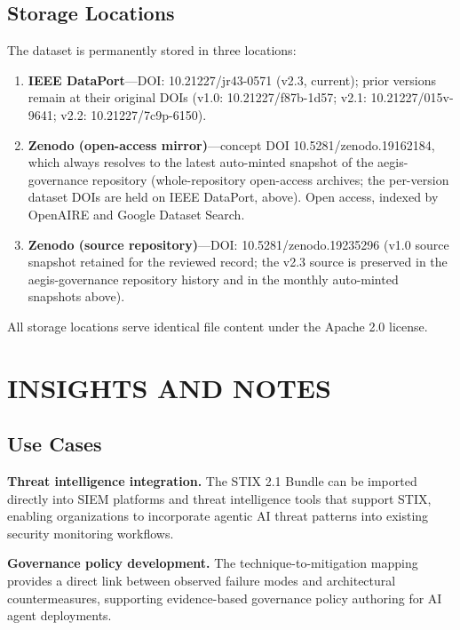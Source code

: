 \documentclass{IEEEoj-data}
\newcommand{\replaced}[2]{#1}
\begin{document}
\subsection*{Storage Locations}

The dataset is permanently stored in three locations:

\begin{enumerate}
\item {\bf IEEE DataPort}---DOI: \replaced{10.21227/jr43-0571 (v2.3, current); prior versions remain at their original DOIs (v1.0: 10.21227/f87b-1d57; v2.1: 10.21227/015v-9641; v2.2: 10.21227/7c9p-6150)}{10.21227/f87b-1d57. Authoritative repository for this submission}.
\item {\bf Zenodo (open-access mirror)}---\replaced{concept DOI 10.5281/zenodo.19162184, which always resolves to the latest auto-minted snapshot of the aegis-governance repository (whole-repository open-access archives; the per-version dataset DOIs are held on IEEE DataPort, above)}{DOI: 10.5281/zenodo.19225676}. Open access, indexed by OpenAIRE and Google Dataset Search.
\item {\bf Zenodo (source repository)}---DOI: \replaced{10.5281/zenodo.19235296 (v1.0 source snapshot retained for the reviewed record; the v2.3 source is preserved in the aegis-governance repository history and in the monthly auto-minted snapshots above)}{10.5281/zenodo.19235296. Archived snapshot of the aegis-governance repository at tag \texttt{atx-1-v1.0}, including all source files, schemas, and documentation}.
\end{enumerate}

All storage locations serve identical file content under the Apache 2.0 license.


\section*{INSIGHTS AND NOTES}

\subsection*{Use Cases}

{\bf Threat intelligence integration.} The STIX 2.1 Bundle can be imported directly into SIEM platforms and threat intelligence tools that support STIX, enabling organizations to incorporate agentic AI threat patterns into existing security monitoring workflows.

{\bf Governance policy development.} The technique-to-mitigation mapping provides a direct link between observed failure modes and architectural countermeasures, supporting evidence-based governance policy authoring for AI agent deployments.
\end{document}
